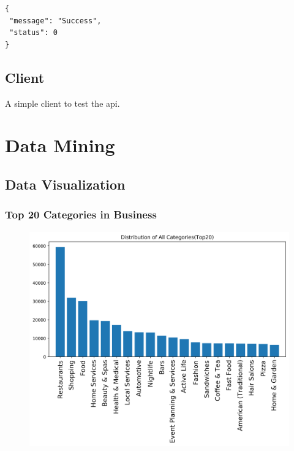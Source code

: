 \documentclass[12pt]{article}
\begin{document}
\begin{singlespacing}
\begin{lstlisting}
{
 "message": "Success",
 "status": 0
}
\end{lstlisting}
\end{singlespacing}

\subsection{Client}
A simple client to test the api.

\section{Data Mining}\label{section-datamining}
\subsection{Data Visualization}
\subsubsection{Top 20 Categories in Business}
\begin{figure}[H]
\begin{center}
    \includegraphics[width=1.0\textwidth]{../05_dataMining/distributionAllCategories.png}
\end{center}
\end{figure}
\end{document}
